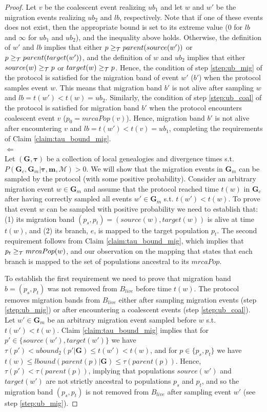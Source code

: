 \documentclass[11pt]{article}
\newcommand{\vect}[1]{\boldsymbol{\mathbf{#1}}}
\newcommand{\M}{\mathcal{M}}
\newcommand{\G}{\vect{G}}
\newcommand{\1}{\mathbbm{1}}
\newcommand{\Gc}{\G_c}
\newcommand{\Gm}{\G_m}
\newcommand{\taus}{\vect\tau}
\newcommand{\migs}{\vect{m}}
\begin{document}
\begin{proof}
 Let $v$ be the coalescent event realizing $ub_1$ and let $w$ and $w'$ be the migration events realizing $ub_2$ and $lb$, respectively.
 Note that if one of these events does not exist, then the appropriate bound is set to its extreme value (0 for $lb$ and $\infty$ for $ub_1$ and $ub_2$),
 and the inequality above holds. Otherwise,  the definition of $w'$ and $lb$ implies that either $p\geq_{\mathcal{T}} parent(source(w'))$ or $p\geq_{\mathcal{T}} parent(target(w'))$,
 and the definition of $w$ and $ub_2$ implies that either $source(w)\geq_{\mathcal{T}} p$ or $target(w)\geq_{\mathcal{T}} p$.
 Hence, the condition of step \ref{step:ub_mig} of the protocol is satisfied for the migration band of event $w'$ ($b'$) when the protocol samples event $w$.
 This means that migration band $b'$ is not alive after sampling $w$ and $lb = t(w') < t(w) = ub_2$.
 Similarly, the condition of step \ref{step:ub_coal} of the protocol is satisfied for migration band $b'$ when the protocol encounters coalescent event $v$
 ($p_0=mrcaPop(v)$). Hence, migration band $b'$ is not alive after encountering $v$ and $lb = t(w') < t(v) = ub_1$, completing the requirements of Claim \ref{claim:tau_bound_mig}.\\
 $\Leftarrow$\\
 Let $(\G,\taus)$ be a collection of local genealogies and divergence times s.t. $P(\Gc,\Gm|\taus,\migs,\M)>0$.
 We will show that the migration events in $\Gm$ can be sampled by the protocol (with some positive probability).
 Consider an arbitrary migration event $w\in\Gm$ and assume that the protocol reached time $t(w)$ in $\Gc$ after
 having correctly sampled all events $w'\in\Gm$ s.t. $t(w')<t(w)$.
 To prove that event $w$ can be sampled with positive probability we need to establish that:
 (1) its migration band $(p_s,p_t)=(source(w),target(w))$ is alive at time $t(w)$,
 and (2) its branch, $e$, is mapped to the target population $p_t$.
 The second requirement follows from Claim \ref{claim:tau_bound_mig}, which implies that $p_t\geq_{\mathcal{T}} mrcaPop(w)$, and our observation on the mapping that
 states that each branch is mapped to the set of populations ancestral to its $mrcaPop$.
 
 To establish the first requirement we need to prove that migration band $b=(p_s,p_t)$ was not removed from $B_{live}$ before time $t(w)$.
 The protocol removes migration bands from $B_{live}$ either after sampling migration events (step \ref{step:ub_mig}) or
 after encountering a coalescent events (step \ref{step:ub_coal}).
 Let $w'\in\Gm$ be an arbitrary migration event sampled before $w$ s.t. $t(w')<t(w)$.
 Claim \ref{claim:tau_bound_mig} implies that for $p'\in\{source(w'),target(w')\}$ we have $\tau(p')<ubound_2(p'|\G)\leq t(w') < t(w)$, and
 for $p\in\{p_s,p_t\}$ we have $t(w)\leq lbound(parent(p)|\G) \leq \tau(parent(p))$.
 Hence, $\tau(p')<\tau(parent(p))$, implying that populations $source(w')$ and $target(w')$ are not strictly ancestral to populations $p_s$ and $p_t$,
 and so the migration band $(p_s,p_t)$ is not removed from $B_{live}$ after sampling event $w'$ (see step \ref{step:ub_mig}).
 

\end{proof}
\end{document}
